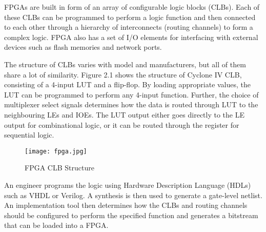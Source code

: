 FPGAs are built in form of an array of configurable logic blocks (CLBs). Each of these CLBs can be programmed to perform a logic function and then connected to each other through a hierarchy of interconnects (routing channels) to form a complex logic. FPGA also has a set of I/O elements for interfacing with external devices such as flash memories and network ports.

The structure of CLBs varies with model and manufacturers, but all of them share a lot of similarity. Figure 2.1 shows the structure of Cyclone IV CLB, consisting of a 4-input LUT and a flip-flop. By loading appropriate values, the LUT can be programmed to perform any 4-input function. Further, the choice of multiplexer select signals determines how the data is routed through LUT to the neighbouring LEs and IOEs. The LUT output either goes directly to the LE output for combinational logic, or it can be routed through the register for sequential logic.
\begin{figure}[H]
\centering
\texttt{[image: fpga.jpg]}
\caption{FPGA CLB Structure}\label{fig:fpga}
\end{figure}

An engineer programs the logic using Hardware Description Language (HDLs) such as VHDL or Verilog. A synthesis is then used to generate a gate-level netlist. An implementation tool then determines how the CLBs and routing channels should be configured to perform the specified function and generates a bitstream that can be loaded into a FPGA.

